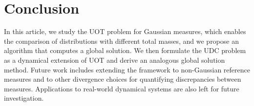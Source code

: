 \documentclass{ifacconf}
\begin{document}










\section{Conclusion}
In this article, we study the UOT problem for Gaussian measures, which enables the comparison of distributions with different total masses, and we propose an algorithm that computes a global solution. We then formulate the UDC problem as a dynamical extension of UOT and derive an analogous global solution method. Future work includes extending the framework to non-Gaussian reference measures and to other divergence choices for quantifying discrepancies between measures. Applications to real-world dynamical systems are also left for future investigation.


\end{document}
